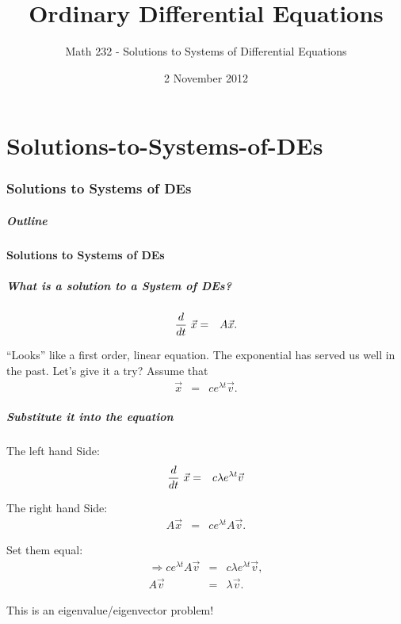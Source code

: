 \part{Solutions-to-Systems-of-DEs}
\section{Solutions to Systems of DEs}


\title{Ordinary Differential Equations}
\subtitle{Math 232 - Solutions to Systems of Differential Equations}
\date{2 November 2012}

\begin{frame}
  \titlepage
\end{frame}

\begin{frame}
  \frametitle{Outline}
  \tableofcontents[ currentsection ]
\end{frame}


\subsection{Solutions to Systems of DEs}


\begin{frame}
  \frametitle{What is a solution to a System of DEs?}

  \begin{eqnarray*}
    \deriv{~}{t} \vec{x} & = & A \vec{x}.
  \end{eqnarray*}

  {
    ``Looks'' like a first order, linear equation. The exponential has
    served us well in the past. Let's give it a try? Assume that 
    \begin{eqnarray*}
      \vec{x} & = & c e^{\lambda t} \vec{v}.
    \end{eqnarray*}
  }


\end{frame}


\begin{frame}
  \frametitle{Substitute it into the equation}

  The left hand Side:
  \begin{eqnarray*}
    \deriv{~}{t} \vec{x} & = & c \lambda e^{\lambda t} \vec{v} \\
  \end{eqnarray*}

  {
    The right hand Side:
    \begin{eqnarray*}
      A \vec{x} & = & c e^{\lambda t} A \vec{v}.
    \end{eqnarray*}
  }

  {
    Set them equal:
    \begin{eqnarray*}
      \Rightarrow c  e^{\lambda t} A \vec{v} & = & c \lambda e^{\lambda t} \vec{v}, \\
      A \vec{v} & = & \lambda \vec{v}.
    \end{eqnarray*}
  }

  {
    This is an eigenvalue/eigenvector problem!
  }

\end{frame}


